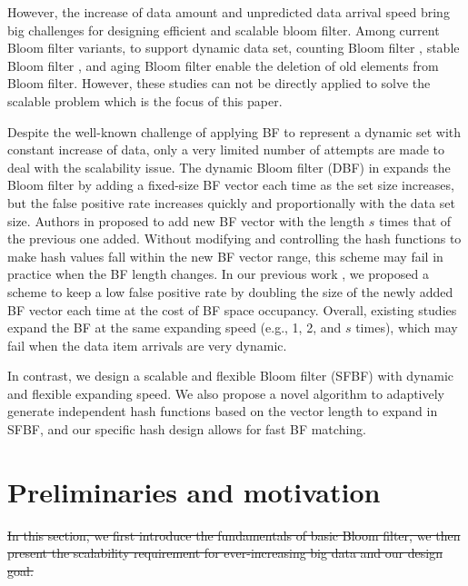 \documentclass[10pt,journal,compsoc]{IEEEtran}
\newcommand{\rev}[1]{#1}
\newcommand{\del}[1]{\sout{#1}}  %
\begin{document}
However, the increase of data amount and unpredicted data arrival speed bring big challenges for designing  efficient and scalable bloom filter. Among current Bloom filter variants, to support dynamic data set, counting Bloom filter \cite{fan2000summary}, stable Bloom filter \cite{deng2006approximately}, and aging Bloom filter \cite{yoon2010aging} enable the deletion of old elements from Bloom filter. However, these studies can not be directly applied to solve the scalable problem which is the focus of this paper.


Despite the well-known challenge of applying BF to represent a dynamic set with constant increase of data, only a very limited number of attempts are made to deal with the scalability issue.
 The dynamic Bloom filter (DBF) in \cite{guo2006theory, wei2010mad2} expands the Bloom filter by adding a fixed-size BF vector each time as the set size increases, but the false positive rate increases \rev{quickly and} proportionally with the data set size. Authors in \cite{almeida2007scalable} proposed to add new BF vector with the length $s$ times that of the previous one added. Without modifying and controlling the hash functions to make hash values fall within the new BF vector range, this scheme may fail \rev{in practice} when the BF length changes.
  In our previous work \cite{xie2007scalable}, we proposed a scheme to keep a low false positive rate by doubling the size of the newly added BF vector each time at the cost of BF space occupancy.  Overall, existing studies expand the BF at the same expanding speed (e.g., 1, 2, and $s$ times), which may fail when the data item arrivals are very dynamic.

In contrast, we design a scalable and flexible Bloom filter (SFBF) with dynamic and flexible expanding speed. We also propose a novel algorithm to adaptively generate \rev{independent} hash functions based on the vector length to expand in SFBF, and our specific hash design allows for fast BF matching.

\section{Preliminaries and motivation}
\label{sec:Review of Bloom filter}
\del{In this section, we first introduce the fundamentals of basic Bloom filter, we then present the scalability requirement for ever-increasing big data and our design goal.}
\end{document}
